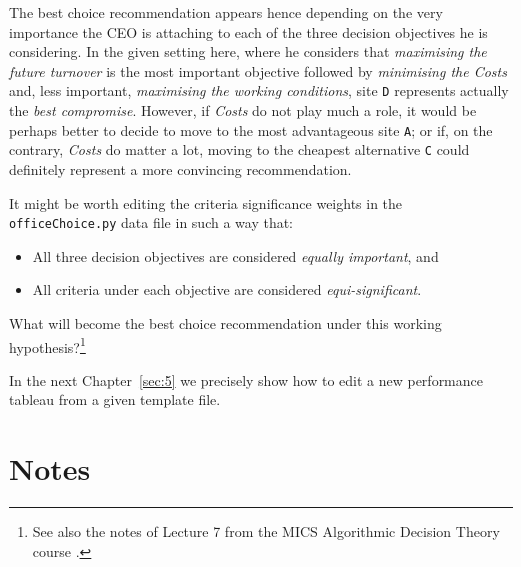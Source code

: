 The best choice recommendation appears hence depending on the very importance the CEO is attaching to each of the three decision objectives he is considering. In the given setting here, where he considers that \emph{maximising the future turnover} is the most important objective followed by \emph{minimising the Costs} and, less important, \emph{maximising the working conditions}, site \texttt{D} represents actually the \emph{best compromise}. However, if \emph{Costs} do not play much a role, it would be perhaps better to decide to move to the most advantageous site \texttt{A}; or if, on the contrary, \emph{Costs} do matter a lot, moving to the cheapest alternative \texttt{C} could definitely represent a more convincing recommendation. 

It might be worth editing the criteria significance weights in the\\
\texttt{officeChoice.py} data file in such a way that:
\begin{itemize}[topsep=2pt]
\item All three decision objectives are considered \emph{equally important}, and
\item All criteria under each objective are considered \emph{equi-significant}.
\end{itemize}

What will become the best choice recommendation under this working hypothesis?\footnote{See also the notes of Lecture 7 from the MICS Algorithmic Decision Theory course \citep{ADT-L7}.} 

\vspace{1cm}

In the next Chapter~\ref{sec:5} we precisely show how to edit a new performance tableau from a given template file. 

{}
\section*{Notes}

